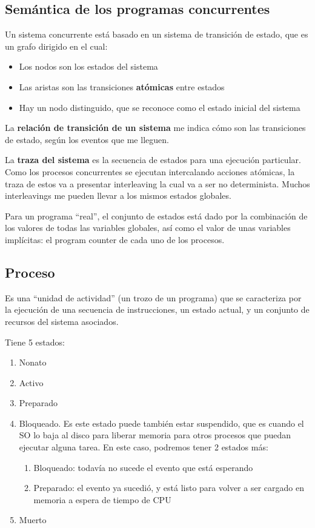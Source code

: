\subsection{Semántica de los programas concurrentes}
Un sistema concurrente está basado en un sistema de transición de estado, que es un grafo dirigido en el cual:
\begin{itemize}
  \item Los nodos son los estados del sistema
  \item Las aristas son las transiciones \textbf{atómicas} entre estados
  \item Hay un nodo distinguido, que se reconoce como el estado inicial del sistema
\end{itemize}

La \textbf{relación de transición de un sistema} me indica cómo son las transiciones de estado, según los eventos que me lleguen.

La \textbf{traza del sistema} es la secuencia de estados para una ejecución particular. Como los procesos concurrentes se ejecutan intercalando acciones atómicas, la traza de estos va a presentar interleaving la cual va a ser no determinista. Muchos interleavings me pueden llevar a los mismos estados globales.

Para un programa ``real'', el conjunto de estados está dado por la combinación de los valores de todas las variables globales, así como el valor de unas variables implícitas: el program counter de cada uno de los procesos.

\subsection{Proceso}
Es una ``unidad de actividad'' (un trozo de un programa) que se caracteriza por la ejecución de una secuencia de instrucciones, un estado actual, y un conjunto de recursos del sistema asociados.

Tiene 5 estados:
\begin{enumerate}
  \item Nonato
  \item Activo
  \item Preparado
  \item Bloqueado. Es este estado puede también estar suspendido, que es cuando el SO lo baja al disco para liberar memoria para otros procesos que puedan ejecutar alguna tarea. En este caso, podremos tener 2 estados más:
    \begin{enumerate}
      \item Bloqueado: todavía no sucede el evento que está esperando
      \item Preparado: el evento ya sucedió, y está listo para volver a ser cargado en memoria a espera de tiempo de CPU
    \end{enumerate}
  \item Muerto
\end{enumerate}

